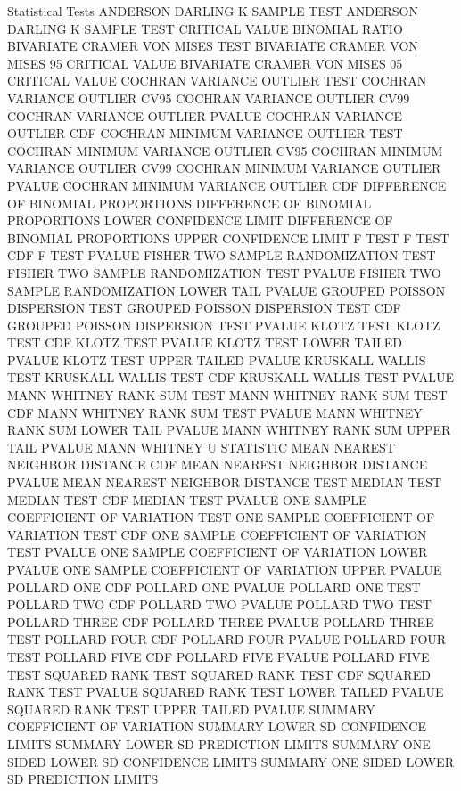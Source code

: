Statistical Tests
   ANDERSON DARLING K SAMPLE TEST
   ANDERSON DARLING K SAMPLE TEST CRITICAL VALUE
   BINOMIAL RATIO
   BIVARIATE CRAMER VON MISES TEST
   BIVARIATE CRAMER VON MISES 95 CRITICAL VALUE
   BIVARIATE CRAMER VON MISES 05 CRITICAL VALUE
   COCHRAN VARIANCE OUTLIER TEST
   COCHRAN VARIANCE OUTLIER CV95
   COCHRAN VARIANCE OUTLIER CV99
   COCHRAN VARIANCE OUTLIER PVALUE
   COCHRAN VARIANCE OUTLIER CDF
   COCHRAN MINIMUM VARIANCE OUTLIER TEST
   COCHRAN MINIMUM VARIANCE OUTLIER CV95
   COCHRAN MINIMUM VARIANCE OUTLIER CV99
   COCHRAN MINIMUM VARIANCE OUTLIER PVALUE
   COCHRAN MINIMUM VARIANCE OUTLIER CDF
   DIFFERENCE OF BINOMIAL PROPORTIONS
   DIFFERENCE OF BINOMIAL PROPORTIONS LOWER CONFIDENCE LIMIT
   DIFFERENCE OF BINOMIAL PROPORTIONS UPPER CONFIDENCE LIMIT
   F TEST
   F TEST CDF
   F TEST PVALUE
   FISHER TWO SAMPLE RANDOMIZATION TEST
   FISHER TWO SAMPLE RANDOMIZATION TEST PVALUE
   FISHER TWO SAMPLE RANDOMIZATION LOWER TAIL PVALUE
   GROUPED POISSON DISPERSION TEST
   GROUPED POISSON DISPERSION TEST CDF
   GROUPED POISSON DISPERSION TEST PVALUE
   KLOTZ TEST
   KLOTZ TEST CDF
   KLOTZ TEST PVALUE
   KLOTZ TEST LOWER TAILED PVALUE
   KLOTZ TEST UPPER TAILED PVALUE
   KRUSKALL WALLIS TEST
   KRUSKALL WALLIS TEST CDF
   KRUSKALL WALLIS TEST PVALUE
   MANN WHITNEY RANK SUM TEST
   MANN WHITNEY RANK SUM TEST CDF
   MANN WHITNEY RANK SUM TEST PVALUE
   MANN WHITNEY RANK SUM LOWER TAIL PVALUE
   MANN WHITNEY RANK SUM UPPER TAIL PVALUE
   MANN WHITNEY U STATISTIC
   MEAN NEAREST NEIGHBOR DISTANCE CDF
   MEAN NEAREST NEIGHBOR DISTANCE PVALUE
   MEAN NEAREST NEIGHBOR DISTANCE TEST
   MEDIAN TEST
   MEDIAN TEST CDF
   MEDIAN TEST PVALUE
   ONE SAMPLE COEFFICIENT OF VARIATION TEST
   ONE SAMPLE COEFFICIENT OF VARIATION TEST CDF
   ONE SAMPLE COEFFICIENT OF VARIATION TEST PVALUE
   ONE SAMPLE COEFFICIENT OF VARIATION LOWER PVALUE
   ONE SAMPLE COEFFICIENT OF VARIATION UPPER PVALUE
   POLLARD ONE CDF
   POLLARD ONE PVALUE
   POLLARD ONE TEST
   POLLARD TWO CDF
   POLLARD TWO PVALUE
   POLLARD TWO TEST
   POLLARD THREE CDF
   POLLARD THREE PVALUE
   POLLARD THREE TEST
   POLLARD FOUR CDF
   POLLARD FOUR PVALUE
   POLLARD FOUR TEST
   POLLARD FIVE CDF
   POLLARD FIVE PVALUE
   POLLARD FIVE TEST
   SQUARED RANK TEST
   SQUARED RANK TEST CDF
   SQUARED RANK TEST PVALUE
   SQUARED RANK TEST LOWER TAILED PVALUE
   SQUARED RANK TEST UPPER TAILED PVALUE
   SUMMARY COEFFICIENT OF VARIATION
   SUMMARY LOWER SD CONFIDENCE LIMITS
   SUMMARY LOWER SD PREDICTION LIMITS
   SUMMARY ONE SIDED LOWER SD CONFIDENCE LIMITS
   SUMMARY ONE SIDED LOWER SD PREDICTION LIMITS
